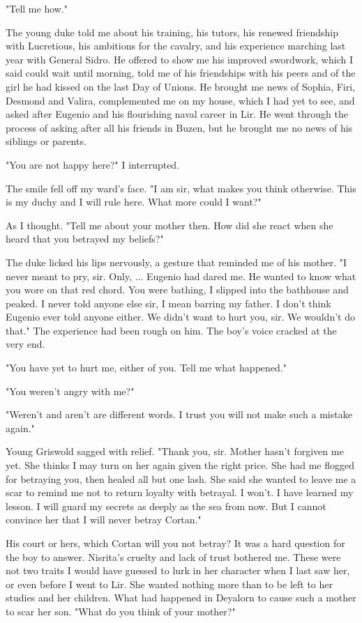 \documentclass{article}
\begin{document}
"Tell me how."

The young duke told me about his training, his tutors, his renewed friendship with Lucretious, his ambitions for the cavalry, and his experience marching last year with General Sidro. He offered to show me his improved swordwork, which I said could wait until morning, told me of his friendships with his peers and of the girl he had kissed on the last Day of Unions. He brought me news of Sophia, Firi, Desmond and Valira, complemented me on my house, which I had yet to see, and asked after Eugenio and his flourishing naval career in Lir. He went through the process of asking after all his friends in Buzen, but he brought me no news of his siblings or parents. 

"You are not happy here?" I interrupted.

The smile fell off my ward's face. "I am sir, what makes you think otherwise. This is my duchy and I will rule here. What more could I want?"

As I thought. "Tell me about your mother then. How did she react when she heard that you betrayed my beliefs?"

The duke licked his lips nervously, a gesture that reminded me of his mother. "I never meant to pry, sir. Only, ... Eugenio had dared me. He wanted to know what you wore on that red chord. You were bathing, I slipped into the bathhouse and peaked. I never told anyone else sir, I mean barring my father. I don't think Eugenio ever told anyone either. We didn't want to hurt you, sir. We wouldn't do that." The experience had been rough on him. The boy's voice cracked at the very end.

"You have yet to hurt me, either of you. Tell me what happened."

"You weren't angry with me?"

"Weren't and aren't are different words. I trust you will not make such a mistake again."

Young Griswold sagged with relief. "Thank you, sir. Mother hasn't forgiven me yet. She thinks I may turn on her again given the right price. She had me flogged for betraying you, then healed all but one lash. She said she wanted to leave me a scar to remind me not to return loyalty with betrayal. I won't. I have learned my lesson. I will guard my secrets as deeply as the sea from now. But I cannot convince her that I will never betray Cortan."

His court or hers, which Cortan will you not betray? It was a hard question for the boy to answer. Nisrita's cruelty and lack of trust bothered me. These were not two traits I would have guessed to lurk in her character when I last saw her, or even before I went to Lir. She wanted nothing more than to be left to her studies and her children. What had happened in Deyalorn to cause such a mother to scar her son. "What do you think of your mother?"
\end{document}
